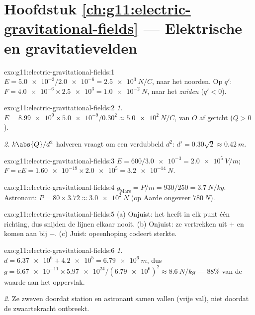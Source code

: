 \section*{Hoofdstuk \ref{ch:g11:electric-gravitational-fields} --- Elektrische en gravitatievelden}

\begin{solution}{exo:g11:electric-gravitational-fields:1}
$E = \num{5.0e-3} / \num{2.0e-6} = \qty{2.5e3}{N/C}$, naar het noorden.
Op $q'$: $F = \num{4.0e-6} \times \num{2.5e3} = \qty{1.0e-2}{N}$, naar
het \emph{zuiden} ($q' < 0$).
\end{solution}

\begin{solution}{exo:g11:electric-gravitational-fields:2}
\emph{1.} $E = \num{8.99e9} \times \num{5.0e-9} / 0.30^2
\approx \qty{5.0e2}{N/C}$, van $O$ af gericht ($Q > 0$).

\emph{2.} $k\abs{Q}/d^2$ halveren vraagt om een verdubbeld $d^2$:
$d' = 0.30\sqrt{2} \approx \qty{0.42}{m}$.
\end{solution}

\begin{solution}{exo:g11:electric-gravitational-fields:3}
$E = 600 / \num{3.0e-3} = \qty{2.0e5}{V/m}$;
$F = eE = \num{1.60e-19} \times \num{2.0e5} = \qty{3.2e-14}{N}$.
\end{solution}

\begin{solution}{exo:g11:electric-gravitational-fields:4}
$g_{\text{Mars}} = P/m = 930/250 = \qty{3.7}{N/kg}$. Astronaut:
$P = 80 \times 3.72 \approx \qty{3.0e2}{N}$ (op Aarde ongeveer
$\qty{780}{N}$).
\end{solution}

\begin{solution}{exo:g11:electric-gravitational-fields:5}
(a) Onjuist: het  heeft in elk punt één richting, dus snijden de
lijnen elkaar nooit. (b) Onjuist: ze vertrekken uit $+$ en komen aan bij
$-$. (c) Juist: opeenhoping codeert sterkte.
\end{solution}

\begin{solution}{exo:g11:electric-gravitational-fields:6}
\emph{1.} $d = \num{6.37e6} + \num{4.2e5} = \qty{6.79e6}{m}$, dus
$g = \num{6.67e-11} \times \num{5.97e24} / (\num{6.79e6})^2
\approx \qty{8.6}{N/kg}$ --- $88\%$ van de waarde aan het oppervlak.

\emph{2.} Ze zweven doordat station en astronaut samen vallen (vrije
val), niet doordat de zwaartekracht ontbreekt.
\end{solution}

